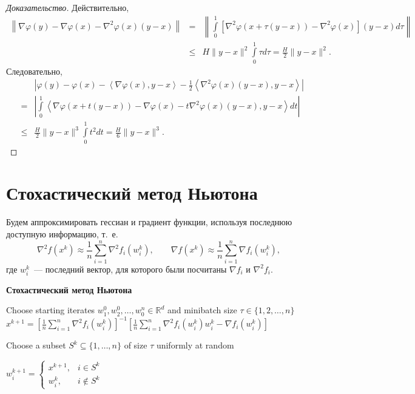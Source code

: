 \documentclass[a4paper, 12pt]{article}
\newcommand{\R}{\mathbb{R}}
\begin{document}
	\begin{proof}[Доказательство]
		Действительно,
		\begin{eqnarray*}
			\left\|\nabla \varphi(y) - \nabla\varphi(x) - \nabla^2 \varphi(x)(y-x)\right\|	& = &\left\|\int\limits_0^1\left[\nabla^2 \varphi(x+\tau(y-x)) - \nabla^2 \varphi(x)\right](y-x)d\tau\right\|\\
			&\leq & H\|y-x\|^2\int\limits_0^1\tau d\tau = \frac{H}{2}\|y-x\|^2.
		\end{eqnarray*}	
		Следовательно, 
		\begin{eqnarray*}
			&&\left|\varphi(y)-\varphi(x)-\left<\nabla \varphi(x),y-x\right>-\frac{1}{2}\left<\nabla^2\varphi(x)(y-x), y-x\right>\right|\\
			&=& \left|\int\limits_0^1\left<\nabla \varphi(x+t(y-x))-\nabla\varphi(x)-t\nabla^2\varphi(x)(y-x),y-x\right>dt\right|\\
			&\leq&\frac{H}{2}\|y-x\|^3\int\limits_0^1t^2dt = \frac{H}{6}\|y-x\|^3.
		\end{eqnarray*}
	\end{proof}
	
	\section{Стохастический метод Ньютона}
	\noindent Будем аппроксимировать гессиан и градиент функции, используя последнюю доступную информацию, т.~е.
	\begin{equation*}
		\nabla^2 f(x^k) \approx \frac{1}{n}\sum\limits_{i=1}^n \nabla^2 f_i(w_i^k), \qquad \nabla f(x^k) \approx \frac{1}{n}\sum\limits_{i=1}^n\nabla f_i(w_i^k),
	\end{equation*}
	где $w_i^k$~--- последний вектор, для которого были посчитаны $\nabla f_i$ и $\nabla^2 f_i$.	
	
	
	\begin{algorithm}[h]
		\caption{{\bf Стохастический метод Ньютона}}
		\label{alg:SN}
		\begin{algorithmic}
			 Choose starting iterates $w^0_1, w^0_2,\dots, w_0^n \in \R^d$ and minibatch size $\tau \in \{1, 2,\dots, n\}$
				\STATE $x^{k+1} = \left[\frac{1}{n}\sum\limits_{i=1}^n \nabla^2 f_i(w_i^k)\right]^{-1}\left[\frac{1}{n}\sum\limits_{i=1}^n\nabla^2 f_i(w_i^k)w_i^k-\nabla f_i(w_i^k)\right]$
				
				\STATE Choose a subset $S^k \subseteq \{1,\dots, n\}$ of size $\tau$ uniformly at random
				
				\STATE $w_i^{k+1} = 
					\begin{cases}
						x^{k+1}, & i \in S^k\\
						w_i^k, & i \notin S^k
				 	\end{cases}$
			\ENDFOR
		\end{algorithmic}
	\end{algorithm} 
	
\end{document}
